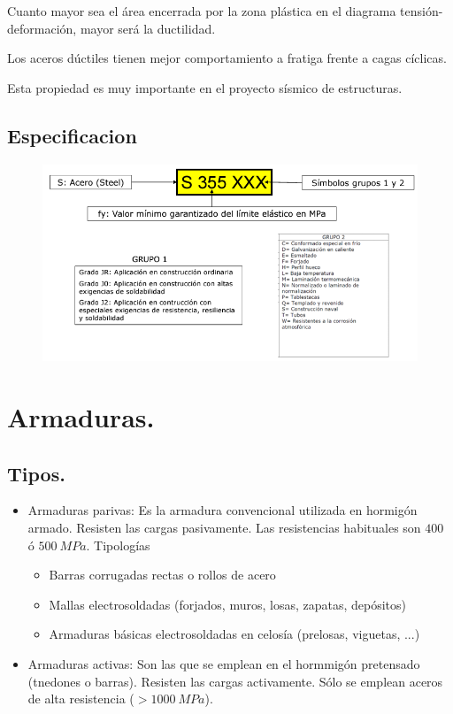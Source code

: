 Cuanto mayor sea el área encerrada por la zona plástica en el diagrama tensión-deformación, mayor será la ductilidad.

Los aceros dúctiles tienen mejor comportamiento a fratiga frente a cagas cíclicas.

Esta propiedad es muy importante en el proyecto sísmico de estructuras.

\subsection{Especificacion}

\begin{figure}[H]
    \centering
    \includegraphics[width = 0.5 \textwidth]{Imagenes/Aceros Estructurales Especificacion.png}
\end{figure}

\section{Armaduras.}
\subsection{Tipos.}
\begin{itemize}
    \item Armaduras parivas: Es la armadura convencional utilizada en hormigón armado. Resisten las cargas pasivamente. Las resistencias habituales son $400$ ó $500\ MPa$. Tipologías
    \begin{itemize}
        \item Barras corrugadas rectas o rollos de acero
        \item Mallas electrosoldadas (forjados, muros, losas, zapatas, depósitos)
        \item Armaduras básicas electrosoldadas en celosía (prelosas, viguetas, ...)
    \end{itemize}
    \item Armaduras activas: Son las que se emplean en el hormmigón pretensado (tnedones o barras). Resisten las cargas activamente. Sólo se emplean aceros de alta resistencia ($> 1000\ MPa$).
\end{itemize}

